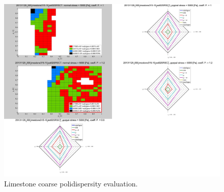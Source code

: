 \begin{figure}[!htb]
\centering
\includegraphics[width=.96\columnwidth]{images/085limestone31510}
\caption[Limestone coarse polidispersity evaluation]{Limestone coarse polidispersity
evaluation.}
\label{fig:085limestone31510}
\end{figure}